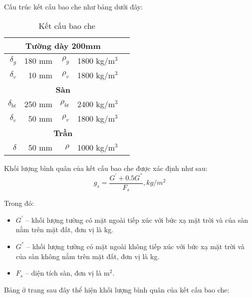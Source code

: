 Cấu trúc kết cấu bao che như bảng dưới đây:

\begin{wraptable}[13]{l}{0.4\textwidth}
	\caption{Kết cấu bao che}
	\begin{tabular}{|r|r|r|r|r|}
		\hline
		\multicolumn{4}{|c|}{\textbf{Tường dày 200mm}} \bigstrut\\
		\hline
		\textbf{{\large $\delta_{g}$}} & 180 mm & {\large $\rho_{g}$} & 1800 kg/m$^3$ \bigstrut\\
		\hline
		{\large $\delta_{v}$} & 10 mm & \textbf{{\large $\rho_{v}$}} & 1800 kg/m$^3$ \bigstrut\\
		\hline
		\multicolumn{4}{|c|}{\textbf{Sàn}} \bigstrut\\
		\hline
		\textbf{{\large $\delta_{bt}$}} & 250 mm & {\large $\rho_{bt}$} & 2400 kg/m$^3$ \bigstrut\\
		\hline
		\textbf{{\large $\delta_{v}$}} & 50 mm & \textbf{{\large $\rho_{v}$}} & 1800 kg/m$^3$ \bigstrut\\
		\hline
		\multicolumn{4}{|c|}{\textbf{Trần}} \bigstrut\\
		\hline
		\textbf{{\large $\delta$}} & 50 mm & \textbf{{\large $\rho$}} & 1000 kg/m$^3$ \bigstrut\\
		\hline
	\end{tabular}
	\label{b:kcbc}%
\end{wraptable}%

\vspace{0.5cm}
Khối lượng bình quân của kết cấu bao che được xác định như sau:
\begin{equation*}
	g_{s} = \dfrac{G^{'}+0.5G^{''}}{F_{s}}, kg/m^2 
\end{equation*}

Trong đó:
\begin{itemize}
	\item $G^{'}$ -- khối lượng tường có mặt ngoài tiếp xúc với bức xạ mặt trời và của sàn nằm trên mặt đất, đơn vị là kg.
	\item $G^{''}$ -- khối lượng tường có mặt ngoài không tiếp xúc với bức xạ mặt trời và của sàn không nằm trên mặt đất, đơn vị là kg.
	\item $F_{s}$ -- diện tích sàn, đơn vị là m$^2$.
\end{itemize}

Bảng ở trang sau đây thể hiện khối lượng bình quân của kết cấu bao che:

